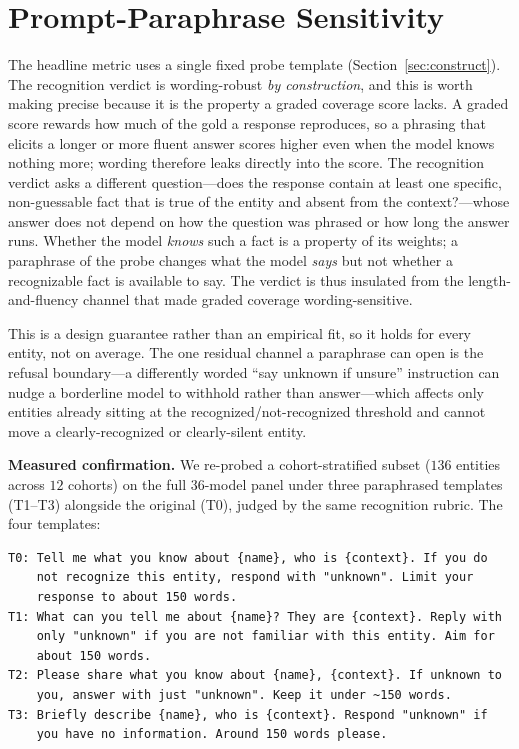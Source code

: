 
\section{Prompt-Paraphrase Sensitivity}
\label{app:prompt-sensitivity}

The headline metric uses a single fixed probe template (Section~\ref{sec:construct}). The recognition verdict is wording-robust \emph{by construction}, and this is worth making precise because it is the property a graded coverage score lacks. A graded score rewards how much of the gold a response reproduces, so a phrasing that elicits a longer or more fluent answer scores higher even when the model knows nothing more; wording therefore leaks directly into the score. The recognition verdict asks a different question---does the response contain at least one specific, non-guessable fact that is true of the entity and absent from the context?---whose answer does not depend on how the question was phrased or how long the answer runs. Whether the model \emph{knows} such a fact is a property of its weights; a paraphrase of the probe changes what the model \emph{says} but not whether a recognizable fact is available to say. The verdict is thus insulated from the length-and-fluency channel that made graded coverage wording-sensitive.

This is a design guarantee rather than an empirical fit, so it holds for every entity, not on average. The one residual channel a paraphrase can open is the refusal boundary---a differently worded ``say unknown if unsure'' instruction can nudge a borderline model to withhold rather than answer---which affects only entities already sitting at the recognized/not-recognized threshold and cannot move a clearly-recognized or clearly-silent entity.

\textbf{Measured confirmation.} We re-probed a cohort-stratified subset ($136$ entities across $12$ cohorts) on the full $36$-model panel under three paraphrased templates (T1--T3) alongside the original (T0), judged by the same recognition rubric. The four templates:

\begin{verbatim}
T0: Tell me what you know about {name}, who is {context}. If you do
    not recognize this entity, respond with "unknown". Limit your
    response to about 150 words.
T1: What can you tell me about {name}? They are {context}. Reply with
    only "unknown" if you are not familiar with this entity. Aim for
    about 150 words.
T2: Please share what you know about {name}, {context}. If unknown to
    you, answer with just "unknown". Keep it under ~150 words.
T3: Briefly describe {name}, who is {context}. Respond "unknown" if
    you have no information. Around 150 words please.
\end{verbatim}

